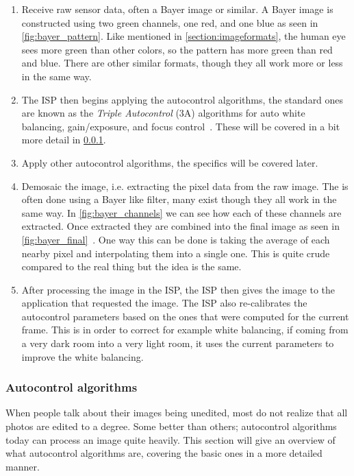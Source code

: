\begin{enumerate}
    \item Receive raw sensor data, often a Bayer image or similar. A Bayer
        image is constructed using two green channels, one red, and one blue as
        seen in \cref{fig:bayer_pattern}. Like mentioned in \cref{section:imageformats},
        the human eye sees more green than other colors, so the pattern has
        more green than red and blue. There are other similar formats, though
        they all work more or less in the same way.

    \item The ISP then begins applying the autocontrol algorithms, the standard
        ones are known as the \textit{Triple Autocontrol} (3A) algorithms for
        auto white balancing, gain/exposure, and focus control~\cite{libcameraStack}.
        These will be covered in a bit more detail in
        \cref{section:autocontrol}.

    \item Apply other autocontrol algorithms, the specifics will be covered later.

    \item Demosaic the image, i.e. extracting the pixel data from the raw
        image. The is often done using a Bayer like filter, many exist though
        they all work in the same way. In \cref{fig:bayer_channels} we can see
        how each of these channels are extracted. Once extracted they are
        combined into the final image as seen in \cref{fig:bayer_final}~\cite{li2008image, libcameraStack}. One
        way this can be done is taking the average of each nearby pixel and
        interpolating them into a single one. This is quite crude compared to
        the real thing but the idea is the same.

    \item After processing the image in the ISP, the ISP then gives the image
        to the application that requested the image. The ISP also re-calibrates
        the autocontrol parameters based on the ones that were computed for the
        current frame. This is in order to correct for example white balancing,
        if coming from a very dark room into a very light room, it uses the
        current parameters to improve the white balancing.

\end{enumerate}

\subsubsection{Autocontrol algorithms} \label{section:autocontrol}
When people talk about their images being unedited, most do not realize that all
photos are edited to a degree. Some better than others; autocontrol algorithms
today can process an image quite heavily. This section will give an overview of
what autocontrol algorithms are, covering the basic ones in a more detailed
manner.

